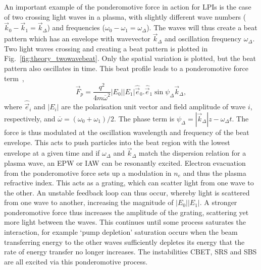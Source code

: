 An important example of the ponderomotive force in action for \ac{LPIs} is the case of two crossing light waves in a plasma, with slightly different wave numbers ($\vec{k}_0-\vec{k}_1 = \vec{k}_\Delta$) and frequencies ($\omega_0-\omega_1 = \omega_\Delta$).
The waves will thus create a beat pattern which has an envelope with wavevector $\vec{k}_\Delta$ and oscillation frequency $\omega_\Delta$.
Two light waves crossing and creating a beat pattern is plotted in Fig.~\ref{fig:theory_twowavebeat}.
Only the spatial variation is plotted, but the beat pattern also oscillates in time.
This beat profile  leads to a ponderomotive force term~\cite{michel_introduction_2023},
\begin{equation}
    \vec{F}_p = \frac{q^2}{4 m \overline{\omega}^2}|E_0| |E_1| \hat{\vec{e}}_0 . \hat{\vec{e}}_1 \sin{\psi_\Delta}\vec{k}_\Delta,
\end{equation}
where $\hat{\vec{e}}_i$ and $|E_i|$ are the polarisation unit vector and field amplitude of wave $i$, respectively, and $\overline{\omega} = (\omega_0 + \omega_1)/2$.
The phase term is $\psi_\Delta = |\vec{k}_\Delta|z - \omega_\Delta t$.
The force is thus modulated at the oscillation wavelength and frequency of the beat envelope.
This acts to push particles into the beat region with the lowest envelope at a given time and if $\omega_\Delta$ and $\vec{k}_\Delta$ match the dispersion relation for a plasma wave, an \ac{EPW} or \ac{IAW} can be resonantly excited.
Electron evacuation from the ponderomotive force sets up a modulation in $n_e$ and thus the plasma refractive index.
This acts as a grating, which can scatter light from one wave to the other.
An unstable feedback loop can thus occur, whereby light is scattered from one wave to another, increasing the magnitude of $|E_0| |E_1|$.
A stronger ponderomotive force thus increases the amplitude of the grating, scattering yet more light between the waves.
This continues until some process saturates the interaction, for example `pump depletion' saturation occurs when the beam transferring energy to the other waves sufficiently depletes its energy that the rate of energy transfer no longer increases.
The instabilities \ac{CBET}, \ac{SRS} and \ac{SBS} are all excited via this ponderomotive process.

